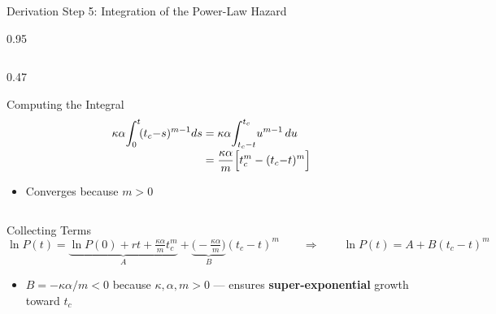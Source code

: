 \documentclass[9pt, aspectratio=169, t]{beamer}
\begin{document}
\begin{frame}{Derivation Step 5: Integration of the Power-Law Hazard}
\begin{cminipage}{0.95\textwidth}
{\begin{columns}[T]
\begin{column}{0.47\textwidth}
\begin{alertblock}{Computing the Integral}
                \vspace{-2mm}
                \begin{align*}
                    \kappa\alpha\!\int_0^t\! (t_c{-}s)^{m-1}ds &= \kappa\alpha\!\int_{t_c-t}^{t_c}\! u^{m-1}\,du \\[-2pt]
                    &= \frac{\kappa\alpha}{m}\Bigl[t_c^m - (t_c{-}t)^m\Bigr]
                \end{align*}
                \vspace{-4mm}
                \begin{itemize}\setlength{\itemsep}{0pt}
                    \item Converges because $m > 0$
                \end{itemize}
            \end{alertblock}
        \end{column}
    \end{columns}
    \vspace{-2mm}
    \begin{exampleblock}{Collecting Terms}
        \vspace{-2mm}
        $$\ln P(t) = \underbrace{\ln P(0) + rt + \tfrac{\kappa\alpha}{m}t_c^m}_{\displaystyle A} + \underbrace{\bigl(-\tfrac{\kappa\alpha}{m}\bigr)}_{\displaystyle B}(t_c - t)^m \qquad\Longrightarrow\qquad \boxed{\ln P(t) = A + B(t_c - t)^m}$$
        \vspace{-3mm}
        \begin{itemize}\setlength{\itemsep}{0pt}
            \item $B = -\kappa\alpha/m < 0$ because $\kappa, \alpha, m > 0$ --- ensures \textbf{super-exponential} growth toward $t_c$
        \end{itemize}
    \end{exampleblock}
    }
    \end{cminipage}
\end{frame}
\end{document}
